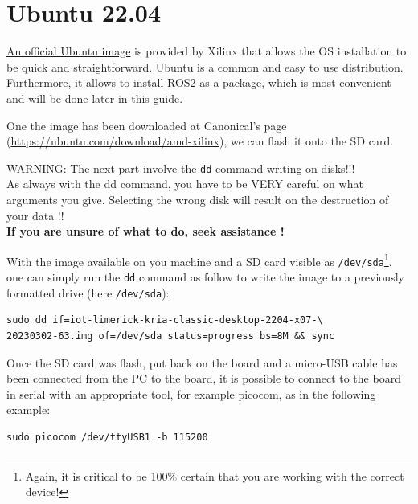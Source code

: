 \documentclass[10pt]{article}
\begin{document}
\section{Ubuntu 22.04}
\label{sec:ubuntu-22.04}
\href{https://ubuntu.com/download/amd-xilinx}{An official Ubuntu image} is provided by Xilinx that allows the OS installation to be quick and
straightforward. Ubuntu is a common and easy to use distribution. Furthermore, it allows to install ROS2 as a package, which is most convenient
and will be done later in this guide.

One the image has been downloaded at Canonical's page (\url{https://ubuntu.com/download/amd-xilinx}), we can flash it onto the SD card.

\begin{tcolorbox}[colback=red!5!white,colframe=red!75!black]
  WARNING: The next part involve the \verb|dd| command writing on disks!!! \\
  As always with the dd command, you have to be VERY careful on what arguments you give. Selecting the wrong disk will result on the destruction of your data !! \\
  \textbf{If you are unsure of what to do, seek assistance !}
\end{tcolorbox}


With the image available on you machine and a SD card visible as \verb|/dev/sda|\footnote{Again, it is critical to be 100\% certain that you are working with the correct device!}, one can simply run the \verb|dd| command as follow to write the image to a previously formatted drive (here \verb|/dev/sda|):
\begin{tcolorbox}
\begin{verbatim}
sudo dd if=iot-limerick-kria-classic-desktop-2204-x07-\
20230302-63.img of=/dev/sda status=progress bs=8M && sync
\end{verbatim}
\end{tcolorbox}

Once the SD card was flash, put back on the board and a micro-USB cable has been connected from the PC to the board, it is possible to
connect to the board in serial with an appropriate tool, for example picocom, as in the following example:
\begin{tcolorbox}
\begin{verbatim}
sudo picocom /dev/ttyUSB1 -b 115200
\end{verbatim}
\end{tcolorbox}
\end{document}
